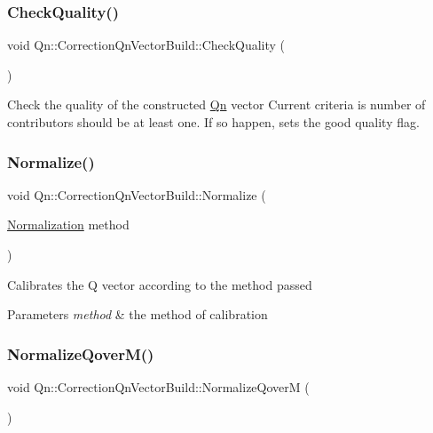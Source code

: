 \subsubsection{\texorpdfstring{Check\+Quality()}{CheckQuality()}}
{\footnotesize\ttfamily void Qn\+::\+Correction\+Qn\+Vector\+Build\+::\+Check\+Quality (\begin{DoxyParamCaption}{ }\end{DoxyParamCaption})\hspace{0.3cm}{\ttfamily [inline]}}

Check the quality of the constructed \mbox{\hyperlink{namespaceQn}{Qn}} vector Current criteria is number of contributors should be at least one. If so happen, sets the good quality flag. \mbox{\label{classQn_1_1CorrectionQnVectorBuild_a2a16337a295cdf8674956432ad009d72}} 
\subsubsection{\texorpdfstring{Normalize()}{Normalize()}}
{\footnotesize\ttfamily void Qn\+::\+Correction\+Qn\+Vector\+Build\+::\+Normalize (\begin{DoxyParamCaption}\item[{\mbox{\hyperlink{classQn_1_1CorrectionQnVector_a2998fe4babb716c57848c8c73b24a398}{Normalization}}}]{method }\end{DoxyParamCaption})\hspace{0.3cm}{\ttfamily [inline]}}

Calibrates the Q vector according to the method passed 
\begin{DoxyParams}{Parameters}
{\em method} & the method of calibration \\
\hline
\end{DoxyParams}
\mbox{\label{classQn_1_1CorrectionQnVectorBuild_abe5a66d644a51087ddd3946bce0c58f5}} 
\subsubsection{\texorpdfstring{Normalize\+Qover\+M()}{NormalizeQoverM()}}
{\footnotesize\ttfamily void Qn\+::\+Correction\+Qn\+Vector\+Build\+::\+Normalize\+QoverM (\begin{DoxyParamCaption}{ }\end{DoxyParamCaption})}

